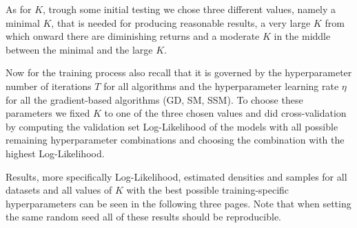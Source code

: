 As for $K$, trough some initial testing we chose three different values, namely a minimal $K$, that is needed for producing reasonable results, 
a very large $K$ from which onward there are diminishing returns and a moderate $K$ in the middle between the minimal and the large $K$.

Now for the training process also recall that it is governed by the hyperparameter number of iterations $T$ for all algorithms and 
the hyperparameter learning rate $\eta$ for all the gradient-based algorithms (GD, SM, SSM).
To choose these parameters we fixed $K$ to one of the three chosen values and did cross-validation by computing the validation set Log-Likelihood 
of the models with all possible remaining hyperparameter combinations and choosing the combination with the highest Log-Likelihood.

Results, more specifically Log-Likelihood, estimated densities and samples for all datasets and all values of $K$ with the best possible training-specific 
hyperparameters can be seen in the following three pages. Note that when setting the same random seed all of these results should be 
reproducible.


